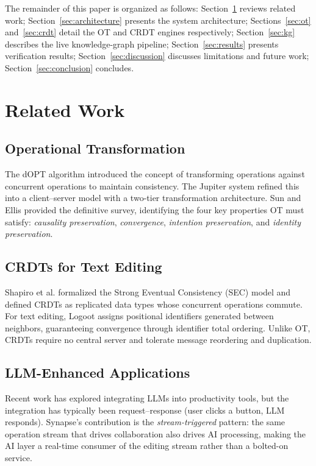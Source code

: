 \documentclass[conference]{IEEEtran}
\begin{document}
The remainder of this paper is organized as follows: Section~\ref{sec:related} reviews related work; Section~\ref{sec:architecture} presents the system architecture; Sections~\ref{sec:ot} and~\ref{sec:crdt} detail the OT and CRDT engines respectively; Section~\ref{sec:kg} describes the live knowledge-graph pipeline; Section~\ref{sec:results} presents verification results; Section~\ref{sec:discussion} discusses limitations and future work; Section~\ref{sec:conclusion} concludes.

\section{Related Work}\label{sec:related}

\subsection{Operational Transformation}

The dOPT algorithm \cite{ellis1989} introduced the concept of transforming operations against concurrent operations to maintain consistency. The Jupiter system \cite{jupiter1995} refined this into a client--server model with a two-tier transformation architecture. Sun and Ellis \cite{sun1998} provided the definitive survey, identifying the four key properties OT must satisfy: \emph{causality preservation}, \emph{convergence}, \emph{intention preservation}, and \emph{identity preservation}.

\subsection{CRDTs for Text Editing}

Shapiro et al. \cite{shapiro2011} formalized the Strong Eventual Consistency (SEC) model and defined CRDTs as replicated data types whose concurrent operations commute. For text editing, Logoot \cite{weiss2009} assigns positional identifiers generated between neighbors, guaranteeing convergence through identifier total ordering. Unlike OT, CRDTs require no central server and tolerate message reordering and duplication.

\subsection{LLM-Enhanced Applications}

Recent work has explored integrating LLMs into productivity tools, but the integration has typically been request--response (user clicks a button, LLM responds). Synapse's contribution is the \emph{stream-triggered} pattern: the same operation stream that drives collaboration also drives AI processing, making the AI layer a real-time consumer of the editing stream rather than a bolted-on service.
\end{document}

